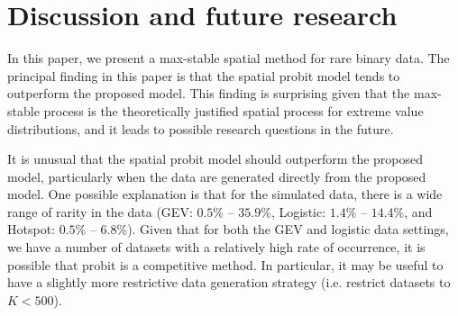 \section{Discussion and future research}\label{rbs:conclusions}
In this paper, we present a max-stable spatial method for rare binary data.
The principal finding in this paper is that the spatial probit model tends to outperform the proposed model.
This finding is surprising given that the max-stable process is the theoretically justified spatial process for extreme value distributions, and it leads to possible research questions in the future.

It is unusual that the spatial probit model should outperform the proposed model, particularly when the data are generated directly from the proposed model.
One possible explanation is that for the simulated data, there is a wide range of rarity in the data (GEV: $0.5\%$ -- $35.9\%$, Logistic: $1.4\%$ -- $14.4\%$, and Hotspot: $0.5\%$ -- $6.8\%$).
Given that for both the GEV and logistic data settings, we have a number of datasets with a relatively high rate of occurrence, it is possible that probit is a competitive method.
In particular, it may be useful to have a slightly more restrictive data generation strategy (i.e. restrict datasets to $K < 500$).